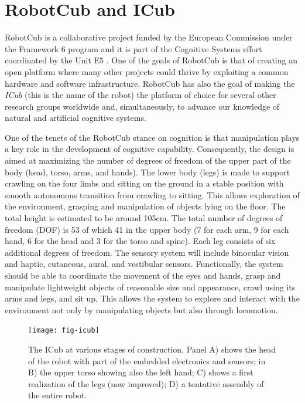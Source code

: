 
\section{RobotCub and ICub}
RobotCub is a collaborative project funded by the European Commission under 
the Framework 6 program and it is part of the Cognitive Systems effort 
coordinated by the Unit E5 \cite{e5-cognition}.
One of the goals of RobotCub is that of creating an open platform where
many other projects could thrive by exploiting a common hardware and software
infrastructure. RobotCub has also the goal of making the {\em ICub} (this is 
the name of the robot) the platform of choice for several other research
groups worldwide and, simultaneously, to advance our knowledge of natural and
artificial cognitive systems.

One of the tenets of the RobotCub stance on cognition is that manipulation 
plays a key role in the development of cognitive capability. Consequently, 
the design is aimed at maximizing the number of degrees of freedom of the upper 
part of the body (head, torso, arms, and hands). The lower body (legs) is made 
to support crawling on the four limbs and sitting on the ground in a stable 
position with smooth autonomous transition from crawling to sitting. This  
allows exploration of the environment, grasping and manipulation of objects 
lying on the floor. The total height is estimated to be around 105cm. The 
total number of degrees of freedom (DOF) is 53 of which 41 in the upper body 
(7 for each arm, 9 for each hand, 6 for the head and 3 for the torso and spine). 
Each leg consists of six additional degrees of freedom. The sensory system will 
include binocular vision and haptic, cutaneous, aural, and vestibular sensors. 
Functionally, the system should be able to coordinate the movement of the eyes 
and hands, grasp and manipulate lightweight objects of reasonable size and 
appearance, crawl using its arms and legs, and sit up. This allows the system 
to explore and interact with the environment not only by manipulating objects 
but also through locomotion.

\begin{figure}[tbp]
\centerline{
\texttt{[image: fig-icub]}
}
\caption{The ICub at various stages of construction. Panel A) shows the head
of the robot with part of the embedded electronics and sensors; in B) the upper
torso showing also the left hand; C) shows a first realization of the legs (now
improved); D) a tentative assembly of the entire robot.} 
\label{fig:icub}
\end{figure}


